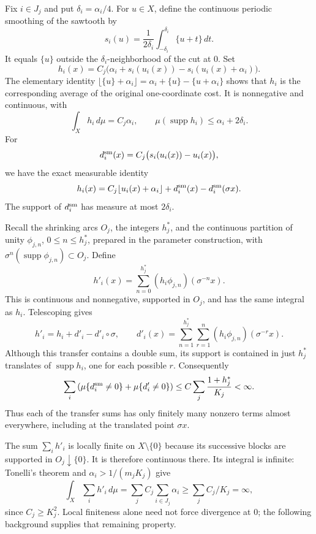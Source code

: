 Fix $i\in J_j$ and put $\delta_i=\alpha_i/4$.  For $u\in X$, define the
continuous periodic smoothing of the sawtooth by
\[
 s_i(u)=\frac1{2\delta_i}\int_{-\delta_i}^{\delta_i}\{u+t\}\,dt.
\]
It equals $\{u\}$ outside the $\delta_i$-neighborhood of the cut at $0$.
Set
\[
 h_i(x)=C_j\bigl(\alpha_i+s_i(u_i(x))
                         -s_i(u_i(x)+\alpha_i)\bigr).
\]
The elementary identity
$\lfloor\{u\}+\alpha_i\rfloor=
\alpha_i+\{u\}-\{u+\alpha_i\}$ shows that $h_i$ is the corresponding
average of the original one-coordinate cost.  It is nonnegative and
continuous, with
\begin{equation}\label{eq:smoothed-support}
 \int_X h_i\,d\mu=C_j\alpha_i,
 \qquad \mu(\operatorname{supp}h_i)\le\alpha_i+2\delta_i.
\end{equation}
For
\[
 d_i^{\rm sm}(x)=C_j\bigl(s_i(u_i(x))-u_i(x)\bigr),
\]
we have the exact measurable identity
\begin{equation}\label{eq:smoothing-coboundary}
 h_i(x)=C_j\lfloor u_i(x)+\alpha_i\rfloor
                  +d_i^{\rm sm}(x)-d_i^{\rm sm}(\sigma x).
\end{equation}
The support of $d_i^{\rm sm}$ has measure at most $2\delta_i$.

Recall the shrinking arcs $O_j$, the integers $h_j^*$, and the continuous
partition of unity $\phi_{j,n}$, $0\le n\le h_j^*$, prepared in the
parameter construction, with
$\sigma^n(\operatorname{supp}\phi_{j,n})\subset O_j$.  Define
\[
 h'_i(x)=\sum_{n=0}^{h_j^*}(h_i\phi_{j,n})(\sigma^{-n}x).
\]
This is continuous and nonnegative, supported in $O_j$, and has the same
integral as $h_i$.  Telescoping gives
\begin{equation}\label{eq:relocation-coboundary}
 h'_i=h_i+d'_i-d'_i\circ\sigma,
 \qquad
 d'_i(x)=\sum_{n=1}^{h_j^*}\sum_{r=1}^n
                      (h_i\phi_{j,n})(\sigma^{-r}x).
\end{equation}
Although this transfer contains a double sum, its support is contained in
just $h_j^*$ translates of $\operatorname{supp}h_i$, one for each possible
$r$.  Consequently
\[
 \sum_i\left(\mu\{d_i^{\rm sm}\ne0\}+\mu\{d'_i\ne0\}\right)
 \le C\sum_j\frac{1+h_j^*}{K_j}<\infty.
\]
Thus each of the transfer sums has only finitely many nonzero terms
almost everywhere, including at the translated point $\sigma x$.

The sum $\sum_i h'_i$ is locally finite on $X\setminus\{0\}$ because its
successive blocks are supported in $O_j\downarrow\{0\}$.  It is therefore
continuous there.  Its integral is infinite: Tonelli's theorem and
$\alpha_i>1/(m_jK_j)$ give
\begin{equation}\label{eq:infinite-cost-integral}
 \int_X\sum_i h'_i\,d\mu
 =\sum_j C_j\sum_{i\in J_j}\alpha_i
 \ge\sum_j C_j/K_j=\infty,
\end{equation}
since $C_j\ge K_j^2$.  Local finiteness alone need not force divergence
at $0$; the following background supplies that remaining property.

